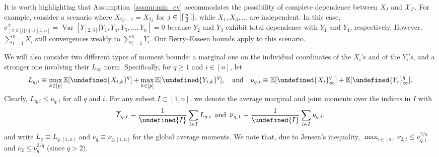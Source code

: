 \documentclass[10pt,a4paper]{amsart}
\theoremstyle{plain}
\theoremstyle{remark}
\newcommand{\textand}{\enskip \text{and} \enskip}
\def\bar#1{\overline{#1}}
\let\abs\undefined %
\DeclarePairedDelimiter\abs{\lvert}{\rvert}
\let\norm\undefined %
\DeclarePairedDelimiter\norm{\lVert}{\rVert}
\DeclarePairedDelimiter\ceil{\lceil}{\rceil}
\newcommand{\Exp}{\mathbb{E}}	%
\newcommand{\Var}{\operatorname{Var}}	%
\begin{document}
It is worth highlighting that Assumption~\eqref{assmp:min_ev} accommodates the possibility of complete dependence between $X_{I}$ and $\mathscr{X}_{I'}$. %
For example, consider a scenario where $X_{2j-1} = X_{2j}$ for $j \in [\ceil{\frac{n}{2}}]$, while $X_1, X_3, \dots$ are independent. In this case, $\sigma^2_{[2,3]|\{1\}\cup[4,n]} = \Var[Y_{[2,3]} | Y_1, Y_4, Y_5, \dots, Y_n] = 0$ because $Y_2$ and $Y_3$ exhibit total dependence with $Y_1$ and $Y_4$, respectively. However,  $\sum_{i=1}^n X_i$ still  convergences weakly to $\sum_{i=1}^n Y_i$. Our Berry--Esseen bounds apply to this scenario.


We will also consider two different types of moment bounds: a marginal one on the individual coordinates of the $X_i$'s and of the $Y_i$'s, and a stronger one involving their $L_\infty$ norm. Specifically, for $q \geq 1$ and $i \in [n]$, let 
\begin{equation}\label{eq:definition-L-nu}
    L_{q,i} \equiv \max_{k \in [p]} \Exp[\abs{X_{i,k}}^q] + \max_{k \in [p]} \Exp[\abs{Y_{i,k}}^q],\quad\mbox{and}\quad
    \nu_{q,i} \equiv \Exp[\norm{X_{i}}_\infty^q] + \Exp[\norm{Y_{i}}_\infty^q].
\end{equation}
Clearly, $L_{q,i} \leq \nu_{q,i}$ for all $q$ and $i$.
For any subset $I \subset [1,n]$, we denote the average marginal and joint moments over the indices in $I$ with
\begin{equation}\label{eq:definition-L-bar-I-and-nu-bar-I}
    \bar{L}_{q,I} \equiv \frac{1}{\abs{I}} \sum_{i \in I} L_{q,i}
    \textand
    \bar\nu_{q,I} \equiv \frac{1}{\abs{I}} \sum_{i \in I} \nu_{q,i}.
\end{equation}
and write $\bar{L}_q \equiv \bar{L}_{q,[1,n]}$ and $\bar{\nu}_q \equiv \bar{\nu}_{q,[1,n]}$ for the global average moments.
We note that, due to Jensen's inequality, $\max_{i \in [n]} \nu_{2,i} \leq \nu_{q,i}^{2/q}$  and $\bar\nu_2 \leq \bar\nu_q^{2/q}$ (since  $q > 2$). 
\end{document}
